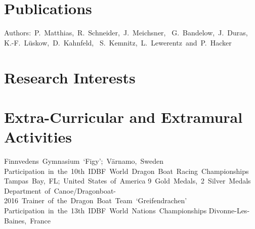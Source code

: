 \documentclass[11pt,a4paper]{moderncv}
\begin{document}
	\section{Publications}
        										{Authors:~P.~Matthias,~R.~Schneider,~J.~Meichsner,~%
														 G.~Bandelow,~J.~Duras,\newline%
														 K.-F.~Lüskow,~D.~Kahnfeld,~%
													   S.~Kemnitz,~L.~Lewerentz~and~P.~Hacker}{}{}{}
	\newpage	
	\section{Research Interests}
	
	\section{Extra-Curricular and Extramural Activities} 
											{Finnvedens~Gymnasium~`Figy';~Värnamo,~Sweden}{}{}{}
								{Participation~in~the~10th~IDBF~World~Dragon~Boat~Racing~Championships\newline}{}%
								{Tampas~Bay,~FL;~United~States~of~America\newline}%
								{9~Gold~Medals,~2~Silver~Medals}
								{Department~of~Canoe/Dragonboat-2016~Trainer~of~the~Dragon~Boat~Team~`Greifendrachen'}{}{}{}{}
								{Participation~in~the~13th~IDBF~World~Nations~Championships\newline}{}%
								{Divonne-Les-Baines,~France}{}
	
\end{document}
